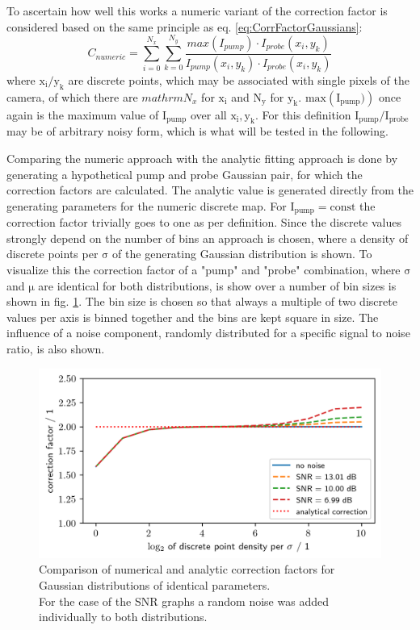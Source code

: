 \documentclass[twoside,openright]{scrreprt}
\begin{document}
To ascertain how well this works a numeric variant of the correction factor is considered based on the same principle as eq. \ref{eq:CorrFactorGaussians}:
\begin{equation*}
C_{numeric} = \sum_{i=0}^{N_x}\sum_{k=0}^{N_y}\frac{max\left(I_{pump}\right)\cdot I_{probe}(x_i,y_k)}{I_{pump}(x_i,y_k)\cdot I_{probe}(x_i,y_k)}
\end{equation*}
where $\mathrm{x_i/y_k}$ are discrete points, which may be associated with single pixels of the camera, of which there are $mathrm{N_x}$ for $\mathrm{x_i}$ and $\mathrm{N_y}$ for $\mathrm{y_k}$. $\mathrm{max\left(I_{pump})\right)}$ once again is the maximum value of $\mathrm{I_{pump}}$ over all $\mathrm{x_i, y_k}$. For this definition $\mathrm{I_{pump}/I_{probe}}$ may be of arbitrary noisy form, which is what will be tested in the following.

Comparing the numeric approach with the analytic fitting approach is done by generating a hypothetical pump and probe Gaussian pair, for which the correction factors are calculated. The analytic value is generated directly from the generating parameters for the numeric discrete map. For $\mathrm{I_{pump} = const}$ the correction factor trivially goes to one as per definition. Since the discrete values strongly depend on the number of bins an approach is chosen, where a density of discrete points per $\mathrm{\sigma}$ of the generating Gaussian distribution is shown. To visualize this the correction factor of a "pump" and "probe" combination, where $\mathrm{\sigma}$ and $\mathrm{\mu}$ are identical for both distributions, is show over a number of bin sizes is shown in fig. \ref{fig:NumericalCorrectionSNR}. The bin size is chosen so that always a multiple of two discrete values per axis is binned together and the bins are kept square in size. The influence of a noise component, randomly distributed for a specific signal to noise ratio, is also shown.

\begin{figure}[h]
\centering
\includegraphics[scale = 1]{images/NumericalCorrectionSNR.png}
\caption{Comparison of numerical and analytic correction factors for Gaussian distributions of identical parameters.\\For the case of the SNR graphs a random noise was added individually to both distributions.\label{fig:NumericalCorrectionSNR}}
\end{figure}
\end{document}
